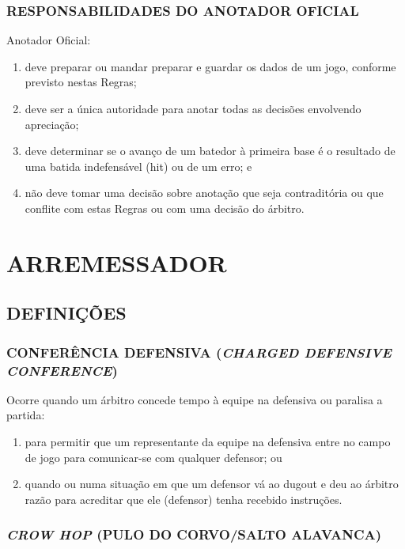 \subsection{RESPONSABILIDADES DO ANOTADOR OFICIAL}

 Anotador Oficial:

	\begin{enumerate}[label=(\alph*)]\item   deve preparar ou mandar preparar e guardar os dados de um jogo, conforme previsto nestas Regras;
	\item  deve ser a única autoridade para anotar todas as decisões envolvendo apreciação;
	\item  deve determinar se o avanço de um batedor à primeira base é o resultado de uma batida indefensável (hit) ou de um erro; e
	\item  não deve tomar uma decisão sobre anotação que seja contraditória ou que conflite com estas Regras ou com uma decisão do árbitro.
	\end{enumerate}

\chapter{ARREMESSADOR}
\minitoc%

\section{DEFINIÇÕES}
\subsection{CONFERÊNCIA DEFENSIVA (\textit{CHARGED DEFENSIVE CONFERENCE})}

 Ocorre quando um árbitro concede tempo à equipe na defensiva ou paralisa a  partida:

\begin{enumerate}[label=(\alph*)]
	\item para permitir que um representante da equipe na defensiva entre no campo de jogo para comunicar-se com qualquer defensor; ou
	\item quando ou numa situação em que um defensor vá ao \gls{dugout} e deu ao árbitro razão para acreditar que ele (defensor) tenha recebido instruções.
\end{enumerate}

\subsection{\textit{CROW HOP} (PULO DO CORVO/SALTO ALAVANCA)}

